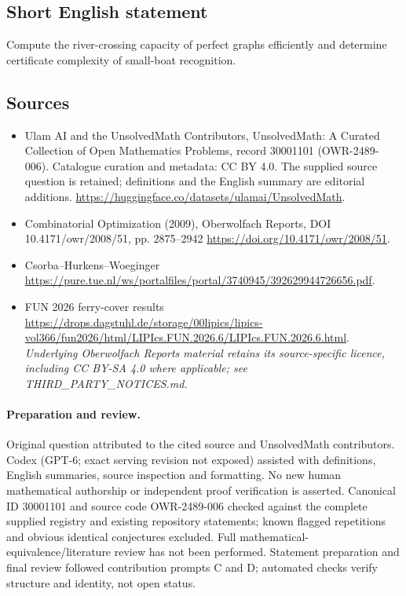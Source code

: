 \documentclass[11pt]{article}
\begin{document}
\subsection{Short English statement}
Compute the river-crossing capacity of perfect graphs efficiently and determine certificate complexity of small-boat recognition.
\subsection{Sources}
\begin{itemize}
\item[\hypertarget{source:30001101:1}{S1}] Ulam AI and the UnsolvedMath Contributors, UnsolvedMath: A Curated Collection of Open Mathematics Problems, record 30001101 (OWR-2489-006). Catalogue curation and metadata: CC BY 4.0. The supplied source question is retained; definitions and the English summary are editorial additions.
\url{https://huggingface.co/datasets/ulamai/UnsolvedMath}.
\item[\hypertarget{source:30001101:2}{S2}] Combinatorial Optimization (2009), Oberwolfach Reports, DOI 10.4171/owr/2008/51, pp. 2875--2942
\url{https://doi.org/10.4171/owr/2008/51}.
\item[\hypertarget{source:30001101:3}{S3}] Csorba--Hurkens--Woeginger
\url{https://pure.tue.nl/ws/portalfiles/portal/3740945/392629944726656.pdf}.
\item[\hypertarget{source:30001101:4}{S4}] FUN 2026 ferry-cover results
\url{https://drops.dagstuhl.de/storage/00lipics/lipics-vol366/fun2026/html/LIPIcs.FUN.2026.6/LIPIcs.FUN.2026.6.html}.
\textit{Underlying Oberwolfach Reports material retains its source-specific licence, including CC BY-SA 4.0 where applicable; see THIRD\_PARTY\_NOTICES.md.}
\end{itemize}
\paragraph{Preparation and review.}
Original question attributed to the cited source and UnsolvedMath contributors. Codex (GPT-6; exact serving revision not exposed) assisted with definitions, English summaries, source inspection and formatting. No new human mathematical authorship or independent proof verification is asserted. Canonical ID 30001101 and source code OWR-2489-006 checked against the complete supplied registry and existing repository statements; known flagged repetitions and obvious identical conjectures excluded. Full mathematical-equivalence/literature review has not been performed. Statement preparation and final review followed contribution prompts C and D; automated checks verify structure and identity, not open status.
\label{end:30001101}
\end{document}
